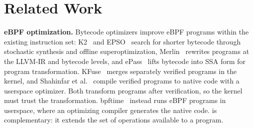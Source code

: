 

\section{Related Work}
\label{sec:related}

\noindent\textbf{eBPF optimization.}
Bytecode optimizers improve eBPF programs within the existing instruction set: K2~\cite{xu2021synthesizing} and EPSO~\cite{zhu2025epso} search for shorter bytecode through stochastic synthesis and offline superoptimization, Merlin~\cite{mao2024merlin} rewrites programs at the LLVM-IR and bytecode levels, and ePass~\cite{xiang2025epass} lifts bytecode into SSA form for program transformation.
KFuse~\cite{kfuse} merges separately verified programs in the kernel, and Shahinfar et al.~\cite{shahinfar2026fun} compile verified programs to native code with a userspace optimizer. Both transform programs after verification, so the kernel must trust the transformation.
bpftime~\cite{zheng2025extending} instead runs eBPF programs in userspace, where an optimizing compiler generates the native code.
\tool is complementary: it extends the set of operations available to a program.

